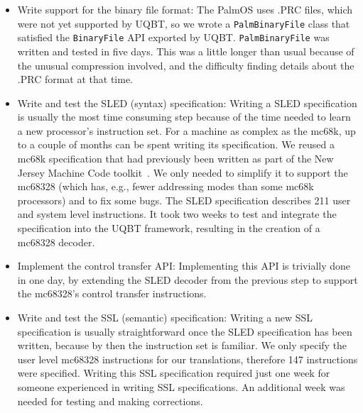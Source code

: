 \begin{itemize}
\item Write support for the binary file format:
        The PalmOS uses .PRC files, which were not yet supported by UQBT,
	so we wrote a \texttt{PalmBinaryFile} class 
	that satisfied the \texttt{BinaryFile} API exported by UQBT. 
	\texttt{PalmBinaryFile} was written and tested in five days.
	This was a little longer than usual because of the unusual 
	compression involved, and the difficulty finding details about 
	the .PRC format at that time.

\item Write and test the SLED (syntax) specification: 
	Writing a SLED specification is usually the most time consuming
	step because of the time needed to learn a new processor's
    instruction set.  
	For a machine as complex as the mc68k, up to a couple of 
    months can be spent writing its specification.  
	We reused a mc68k specification that had previously been written 
	as part of the New Jersey Machine Code toolkit~\cite{Rams97}.
	We only needed to simplify it to support the mc68328
	(which has, e.g., fewer addressing modes than some mc68k processors)
	and to fix some bugs.
    The SLED specification describes 211 user and system level instructions.
	It took two weeks to test and integrate the specification
	into the UQBT framework, resulting in the creation of a 
      mc68328 decoder. 

\item Implement the control transfer API:
    Implementing this API is trivially done in one day, by extending     
    the SLED decoder from the previous step to support the mc68328's
    control transfer instructions.

\item Write and test the SSL (semantic) specification: 
	Writing a new SSL specification is usually straightforward once the 
	SLED specification has been written, because by then the 
	instruction set is familiar.
    We only specify the user level mc68328 instructions for our
    translations, therefore 147 instructions were specified.
	Writing this SSL specification required just one week
	for someone experienced in writing SSL specifications.
    An additional week was needed for testing and making corrections.


\end{itemize}
